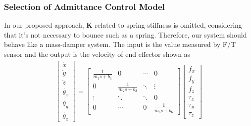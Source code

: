 \subsubsection{Selection of Admittance Control Model}
\hspace*{6mm}In our proposed approach, $\mathbf{K}$ related to spring stiffness is omitted, considering that it's not necessary to bounce such as a spring. Therefore, our system should behave like a mass-damper system. The input is the value measured by F/T sensor and the output is the velocity of end effector shown as 
\begin{equation}
\label{eq:adm_mb}
\begin{split}
\begin{bmatrix}
\dot{x} \\
\dot{y} \\
\dot{z} \\
\dot{\theta _x} \\
\dot{\theta _y }\\
\dot{\theta _z }
\end{bmatrix}
=
\begin{bmatrix}
\frac{1}{m_1s+b_1}&0  &\cdots  &0 \\ 
0 & \frac{1}{m_2s+b_2}  &\ddots  &\vdots \\ 
\vdots&\ddots  &\ddots  & 0\\ 
0   &\cdots & 0 & \frac{1}{m_6s+b_6}
\end{bmatrix}
\begin{bmatrix}
f_x \\
f_y \\
f_z \\
\tau _x \\
\tau _y \\
\tau _z 
\end{bmatrix}
\end{split}
\end{equation}

